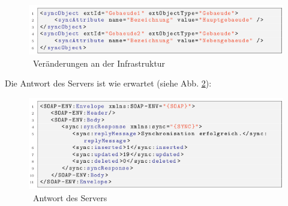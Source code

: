\documentclass[a4paper,10pt]{book}
\begin{document}
\newline
\begin{figure}[htb!]
  \centering
  \includegraphics[scale=.75]{Screenshot/SyncAPI_Fallstudie_11.png}
  \caption{\label{Veraenderungen an der Infrastruktur} \ Veränderungen an der Infrastruktur}
\end{figure}
\newline
Die Antwort des Servers ist wie erwartet (siehe Abb. \ref{Antwort des Servers}):
\newline
\begin{figure}[htb!]
  \centering
  \includegraphics[scale=.7]{Screenshot/SyncAPI_Fallstudie_12.png}
  \caption{\label{Antwort des Servers} \ Antwort des Servers}
\end{figure}
\newline
\end{document}
